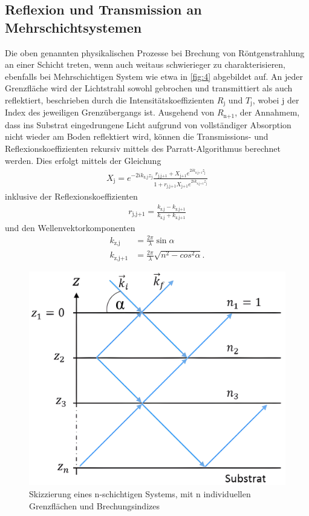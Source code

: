 \documentclass[12pt]{article}
\begin{document}
\subsection{Reflexion und Transmission an Mehrschichtsystemen}\label{subsec:multilevel}
Die oben genannten physikalischen Prozesse bei Brechung von Röntgenstrahlung an einer Schicht treten, wenn auch weitaus schwierieger zu charakterisieren, ebenfalls bei Mehrschichtigen System wie etwa in \autoref{fig:4} abgebildet auf.
An jeder Grenzfläche wird der Lichtstrahl sowohl gebrochen und transmittiert als auch reflektiert, beschrieben durch die Intensitätskoeffizienten $R_\text{j}$ und $T_\text{j}$, wobei $\text{j}$ der Index des jeweiligen Grenzübergangs ist.
Ausgehend von $R_\text{n+1}$, der Annahmem, dass ins Substrat eingedrungene Licht aufgrund von vollständiger Absorption nicht wieder am Boden reflektiert wird, können die Transmissions- und Reflexionskoeffizienten rekursiv mittels des Parratt-Algorithmus berechnet werden.
Dies erfolgt mittels der Gleichung
\begin{align}
  X_\text{j} = e^{-2ik_\text{z,j}z_\text{j}}\frac{r_\text{j,j+1}+X_\text{j+1}e^{2ik_\text{z,j+1}z_\text{j}}}{1+r_\text{j,j+1}X_\text{j+1}e^{2ik_\text{z,j+1}z_\text{j}}}
\end{align}
inklusive der Reflexionskoeffizienten
\begin{align}
  r_\text{j,j+1}=\frac{k_\text{z,j}-k_\text{z,j+1}}{k_\text{z,j}+k_\text{z,j+1}}
\end{align}
und den Wellenvektorkomponenten
\begin{align}
  k_\text{z,j}&=\frac{2\pi}{\lambda}\sin{\alpha}\\
  k_\text{z,j+1}&=\frac{2\pi}{\lambda}\sqrt{n^2-cos^2{\alpha}}\text{.}
\end{align}
\begin{figure}[H]
  \centering
  \includegraphics[scale=0.12]{Ressourcen/mehrschicht.png}
  \caption{Skizzierung eines n-schichtigen Systems, mit n individuellen\\ Grenzflächen und Brechungsindizes\cite{juwi2015}}\label{fig:4}
\end{figure}
\end{document}
